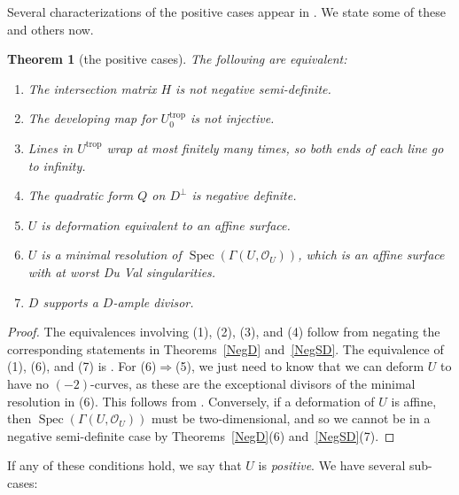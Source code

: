 \documentclass[10pt,a4paper]{amsart}
\numberwithin{equation}{section}
\numberwithin{figure}{section}
\numberwithin{table}{section}
\DeclareMathOperator{\Spec}{Spec}
\DeclareMathOperator{\trop}{trop}
\let\s=\mathcal
\newtheorem{thm}{Theorem}[section]
\theoremstyle{definition}
\begin{document}
Several characterizations of the positive cases appear in \cite[Lemma~6.9]{GHK1}. We state some of these and others now.
\begin{thm}[the positive cases]\label{Pos} The following are equivalent:
\begin{enumerate}\itemsep=0pt
\item[$1.$] The {intersection matrix} $H$ is not negative semi-definite.
\item[$2.$] The {developing map} for $U^{\trop}_0$ is not injective.
\item[$3.$] {Lines} in $U^{\trop}$ wrap at most finitely many times, so both ends of each line go to infinity.
\item[$4.$] The {quadratic form} $Q$ on $D^{\perp}$ is negative definite.
\item[$5.$] $U$ is deformation equivalent to an affine surface.
\item[$6.$] $U$ is a minimal resolution of $\Spec (\Gamma(U,\s{O}_U))$, which is an affine surface with at worst Du Val singularities.
\item[$7.$] $D$ supports a $D$-ample divisor.
\end{enumerate}
\end{thm}
\begin{proof}The equivalences involving (1), (2), (3), and (4) follow from negating the corresponding statements in Theorems~\ref{NegD} and~\ref{NegSD}. The equivalence of (1), (6), and (7) is \cite[Lemma~6.9(1.1--1.3)]{GHK1}. For (6)$\Rightarrow$(5), we just need to know that we can deform $U$ to have no $(-2)$-curves, as these are the exceptional divisors of the minimal resolution in (6). This follows from \cite[Proposition~4.1]{GHK_MLP}. Conversely, if a deformation of $U$ is affine, then $\Spec (\Gamma(U,\s{O}_U))$ must be two-dimensional, and so we cannot be in a negative semi-definite case by Theorems~\ref{NegD}(6) and~\ref{NegSD}(7).
\end{proof}

If any of these conditions hold, we say that $U$ is {\it positive}. We have several sub-cases:
\end{document}
